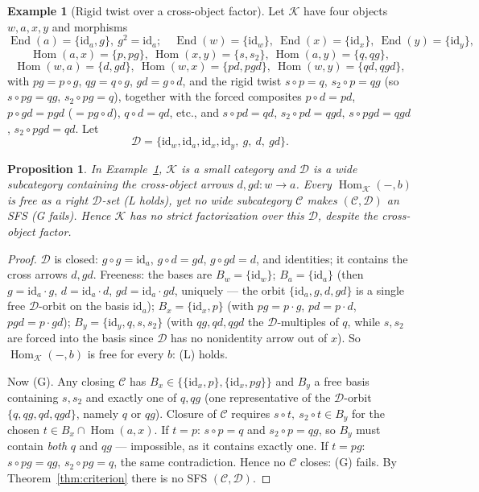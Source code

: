 \documentclass[11pt]{article}
\newtheorem{proposition}[theorem]{Proposition}
\theoremstyle{definition}
\newtheorem{example}[theorem]{Example}
\newcommand{\Hom}{\operatorname{Hom}}
\newcommand{\End}{\operatorname{End}}
\newcommand{\id}{\mathrm{id}}
\newcommand{\C}{\mathcal{C}}
\newcommand{\D}{\mathcal{D}}
\newcommand{\K}{\mathcal{K}}
\begin{document}
\begin{example}[Rigid twist over a cross-object factor]\label{ex:ce}
Let $\K$ have four objects $w,a,x,y$ and morphisms
\[
  \End(a)=\{\id_a,g\},\ g^2=\id_a;\quad \End(w)=\{\id_w\},\
  \End(x)=\{\id_x\},\ \End(y)=\{\id_y\},
\]
\[
  \Hom(a,x)=\{p,pg\},\ \Hom(x,y)=\{s,s_2\},\ \Hom(a,y)=\{q,qg\},
\]
\[
  \Hom(w,a)=\{d,gd\},\ \Hom(w,x)=\{pd,pgd\},\ \Hom(w,y)=\{qd,qgd\},
\]
with $pg=p\circ g$, $qg=q\circ g$, $gd=g\circ d$, and the rigid twist
$s\circ p=q$, $s_2\circ p=qg$ (so $s\circ pg=qg$, $s_2\circ pg=q$), together with
the forced composites $p\circ d=pd$, $p\circ gd=pgd$ ($=pg\circ d$),
$q\circ d=qd$, etc., and $s\circ pd=qd$, $s_2\circ pd=qgd$,
$s\circ pgd=qgd$, $s_2\circ pgd=qd$. Let
\[
  \D=\{\id_w,\id_a,\id_x,\id_y,\ g,\ d,\ gd\}.
\]
\end{example}

\begin{proposition}\label{prop:ce}
In Example~\ref{ex:ce}, $\K$ is a small category and $\D$ is a wide subcategory
containing the cross-object arrows $d,gd:w\to a$. Every $\Hom_\K(-,b)$ is free as
a right $\D$-set \emph{(L holds)}, yet no wide subcategory $\C$ makes $(\C,\D)$ an
SFS \emph{(G fails)}. Hence $\K$ has no strict factorization over this $\D$,
despite the cross-object factor.
\end{proposition}

\begin{proof}
$\D$ is closed: $g\circ g=\id_a$, $g\circ d=gd$, $g\circ gd=d$, and identities;
it contains the cross arrows $d,gd$. Freeness: the bases are
$B_w=\{\id_w\}$; $B_a=\{\id_a\}$ (then $g=\id_a\cdot g$, $d=\id_a\cdot d$,
$gd=\id_a\cdot gd$, uniquely --- the orbit $\{\id_a,g,d,gd\}$ is a single free
$\D$-orbit on the basis $\id_a$); $B_x=\{\id_x,p\}$ (with $pg=p\cdot g$,
$pd=p\cdot d$, $pgd=p\cdot gd$); $B_y=\{\id_y,q,s,s_2\}$ (with $qg,qd,qgd$ the
$\D$-multiples of $q$, while $s,s_2$ are forced into the basis since $\D$ has no
nonidentity arrow out of $x$). So $\Hom_\K(-,b)$ is free for every $b$: (L) holds.

Now (G). Any closing $\C$ has $B_x\in\{\{\id_x,p\},\{\id_x,pg\}\}$ and $B_y$ a
free basis containing $s,s_2$ and exactly one of $q,qg$ (one representative of the
$\D$-orbit $\{q,qg,qd,qgd\}$, namely $q$ or $qg$). Closure of $\C$ requires
$s\circ t,\ s_2\circ t\in B_y$ for the chosen $t\in B_x\cap\Hom(a,x)$. If
$t=p$: $s\circ p=q$ and $s_2\circ p=qg$, so $B_y$ must contain \emph{both} $q$ and
$qg$ --- impossible, as it contains exactly one. If $t=pg$: $s\circ pg=qg$,
$s_2\circ pg=q$, the same contradiction. Hence no $\C$ closes: (G) fails. By
Theorem~\ref{thm:criterion} there is no SFS $(\C,\D)$.
\end{proof}
\end{document}
